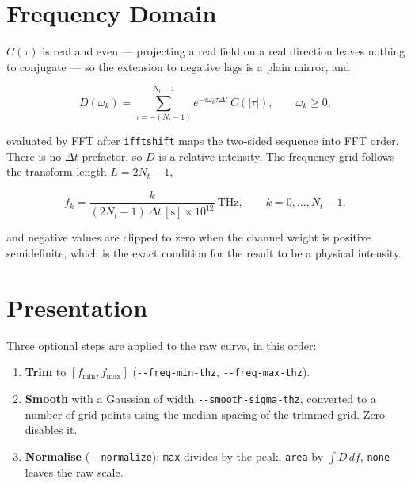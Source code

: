 \documentclass[12pt, a4paper, oneside]{article}
\newcommand{\Nt}{N_t}
\begin{document}
\section{Frequency Domain}

$C(\tau)$ is real and even --- projecting a real field on a real direction
leaves nothing to conjugate --- so the extension to negative lags is a plain
mirror, and

\begin{equation}
\boxed{
    D(\omega_k) = \sum_{\tau=-(\Nt-1)}^{\Nt-1}
                  e^{-i\omega_k\tau\Delta t}\,C(|\tau|),
    \qquad \omega_k \ge 0,
}
\end{equation}

evaluated by FFT after \texttt{ifftshift} maps the two-sided sequence into FFT
order. There is no $\Delta t$ prefactor, so $D$ is a relative intensity. The
frequency grid follows the transform length $L = 2\Nt-1$,

\begin{equation}
    f_k = \frac{k}{(2\Nt-1)\,\Delta t\,[\mathrm{s}]\times10^{12}}\ \mathrm{THz},
    \qquad k = 0,\dots,\Nt-1 ,
\end{equation}

and negative values are clipped to zero when the channel weight is positive
semidefinite, which is the exact condition for the result to be a physical
intensity.

\section{Presentation}

Three optional steps are applied to the raw curve, in this order:

\begin{enumerate}
    \item \textbf{Trim} to $[f_{\min}, f_{\max}]$
    (\texttt{-\/-freq-min-thz}, \texttt{-\/-freq-max-thz}).
    \item \textbf{Smooth} with a Gaussian of width
    \texttt{-\/-smooth-sigma-thz}, converted to a number of grid points using
    the median spacing of the trimmed grid. Zero disables it.
    \item \textbf{Normalise} (\texttt{-\/-normalize}): \texttt{max} divides by
    the peak, \texttt{area} by $\int D\,df$, \texttt{none} leaves the raw
    scale.
\end{enumerate}
\end{document}
